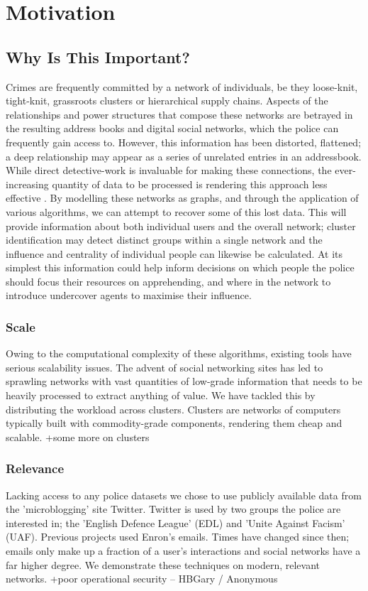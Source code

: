 \chapter{Motivation}

\section{Why Is This Important?}
Crimes are frequently committed by a network of individuals, be they loose-knit,
tight-knit, grassroots clusters or hierarchical supply chains. Aspects of the
relationships and power structures that compose these networks are betrayed in
the resulting address books and digital social networks, which the police can
frequently gain access to. However, this information has been distorted,
flattened; a deep relationship may appear as a series of unrelated entries in an
addressbook. While direct detective-work is invaluable for making these
connections, the ever-increasing quantity of data to be processed is rendering
this approach less effective . By modelling these networks as graphs, and
through the application of various algorithms, we can attempt to recover some of
this lost data. This will provide information about both individual users and
the overall network; cluster identification may detect distinct groups within a
single network and the influence and centrality of individual people can
likewise be calculated. At its simplest this information could help inform
decisions on which people the police should focus their resources on
apprehending, and where in the network to introduce undercover agents to
maximise their influence. 

\subsection{Scale}
Owing to the computational complexity of these algorithms, existing tools have
serious scalability issues. The advent of social networking sites has led to
sprawling networks with vast quantities of low-grade information that needs to
be heavily processed to extract anything of value. We have tackled this by
distributing the workload across clusters. Clusters are networks of computers
typically built with commodity-grade components, rendering them cheap and
scalable.
+some more on clusters

\subsection{Relevance}
Lacking access to any police datasets we chose to use publicly available data
from the 'microblogging' site Twitter. Twitter is used by two groups the police
are interested in; the 'English Defence League' (EDL) and 'Unite Against Facism'
(UAF). Previous projects used Enron's emails. Times have changed since then;
emails only make up a fraction of a user's interactions and social networks have
a far higher degree. We demonstrate these techniques on modern, relevant
networks. 
+poor operational security – HBGary / Anonymous

